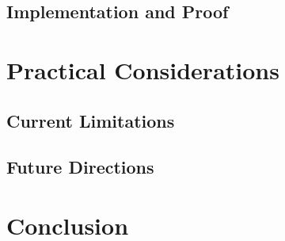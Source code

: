 \documentclass[]{rptuseminar}
\begin{document}
\subsection{Implementation and Proof}  
\label{subsec:implementation}  

\section{Practical Considerations}  
\label{sec:practical-considerations}  
\subsection{Current Limitations}  
\label{subsec:limitations}  

\subsection{Future Directions}  
\label{subsec:future}  

\section{Conclusion}  
\label{sec:conclusion}  

\newpage
\nocite{*}



\end{document}

